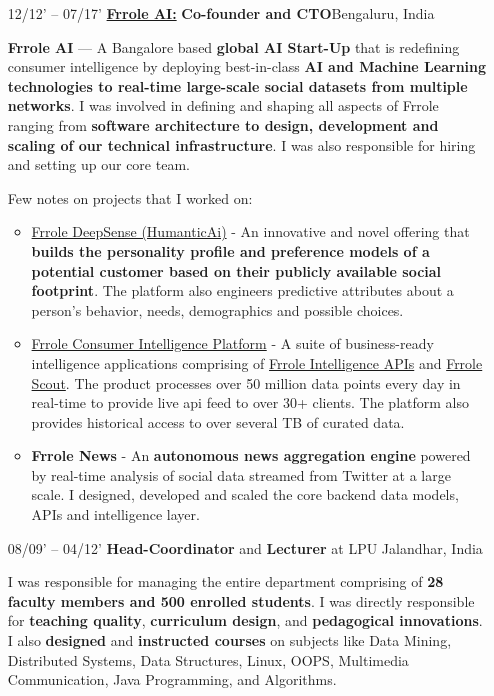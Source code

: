 \documentclass{article}
\begin{document}
\begin{itemize}[leftmargin=-1ex]
  \item[12/12' – 07/17'] \href{https://frrole.ai/}{\textbf{Frrole AI:}} \textbf{Co-founder and CTO}\hfill Bengaluru, India
  \item[]  \textbf{Frrole AI} --- A Bangalore based \textbf{global AI Start-Up} that is redefining consumer intelligence by deploying best-in-class \textbf{AI and Machine Learning technologies to real-time large-scale social datasets from multiple networks}. I was involved in defining and shaping all aspects of Frrole ranging from \textbf{software architecture to design, development and scaling of our technical infrastructure}. I was also responsible for hiring and setting up our core team. 
  
Few notes on projects that I worked on:  \vspace{5pt}
  
  	\begin{itemize} \setlength\itemsep{0.5em}
    
    \item \href{https://frrole.ai/deepsense}{Frrole DeepSense (HumanticAi)} - An innovative and novel offering that \textbf{builds the personality profile and preference models of a potential customer based on their publicly available social footprint}. The platform also engineers predictive attributes about a person's behavior, needs, demographics and possible choices.
  
 	\item \href{https://frrole.ai/platform}{Frrole Consumer Intelligence Platform} - A suite of business-ready intelligence applications comprising of \href{http://api.frrole.com/}{Frrole Intelligence APIs} and \href{https://frrole.ai/scout}{Frrole Scout}. The product processes over 50 million data points every day in real-time to provide live api feed to over 30+ clients. The platform also provides historical access to over several TB of curated data. 
  
  	\item \textbf{Frrole News} - An \textbf{autonomous news aggregation engine} powered by real-time analysis of social data streamed from Twitter at a large scale. I designed, developed and scaled the core backend data models, APIs and intelligence layer. 
  	
	\end{itemize}
     
   \item[08/09' – 04/12'] \textbf{Head-Coordinator} and \textbf{Lecturer} at LPU \hfill Jalandhar, India
   
   \item[] I was responsible for managing the entire department comprising of \textbf{28 faculty members and 500 enrolled students}. I was directly responsible for \textbf{teaching quality}, \textbf{curriculum design}, and \textbf{pedagogical innovations}. I also \textbf{designed} and \textbf{instructed courses} on subjects like Data Mining, Distributed Systems, Data Structures, Linux, OOPS, Multimedia Communication, Java Programming, and Algorithms.

\end{itemize}
\end{document}
